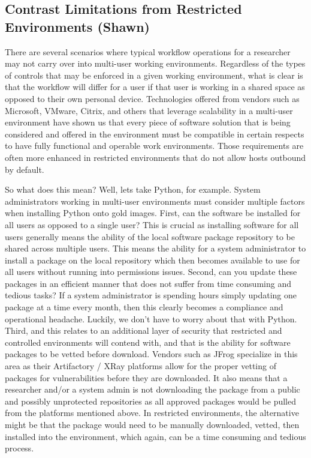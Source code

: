 \documentclass{amia}
\begin{document}
\subsection{Contrast Limitations from Restricted Environments (Shawn)}
        \begin{enumerate}

There are several scenarios where typical workflow operations for a researcher may not carry over into multi-user working environments.  Regardless of the types of controls that may be enforced in a given working environment, what is clear is that the workflow will differ for a user if that user is working in a shared space as opposed to their own personal device.  Technologies offered from vendors such as Microsoft, VMware, Citrix, and others that leverage scalability in a multi-user environment have shown us that every piece of software solution that is being considered and offered in the environment must be compatible in certain respects to have fully functional and operable work environments.  Those requirements are often more enhanced in restricted environments that do not allow hosts outbound by default.

So what does this mean?  Well, lets take Python, for example.  System administrators working in multi-user environments must consider multiple factors when installing Python onto gold images.  First, can the software be installed for all users as opposed to a single user?  This is crucial as installing software for all users generally means the ability of the local software package repository to be shared across multiple users.  This means the ability for a system administrator to install a package on the local repository which then becomes available to use for all users without running into permissions issues.  Second, can you update these packages in an efficient manner that does not suffer from time consuming and tedious tasks?  If a system administrator is spending hours simply updating one package at a time every month, then this clearly becomes a compliance and operational headache.  Luckily, we don't have to worry about that with Python.  Third, and this relates to an additional layer of security that restricted and controlled environments will contend with, and that is the ability for software packages to be vetted before download.  Vendors such as JFrog specialize in this area as their Artifactory / XRay platforms allow for the proper vetting of packages for vulnerabilities before they are downloaded.  It also means that a researcher and/or a system admin is not downloading the package from a public and possibly unprotected repositories as all approved packages would be pulled from the platforms mentioned above.  In restricted environments, the alternative might be that the package would need to be manually downloaded, vetted, then installed into the environment, which again, can be a time consuming and tedious process. 

        \end{enumerate}
\end{document}
